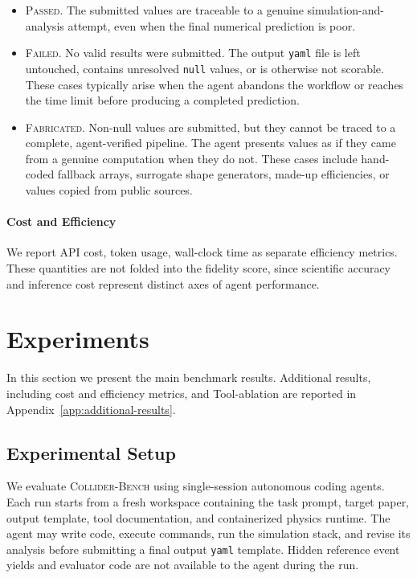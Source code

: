 \documentclass{article}
\newcommand{\ColliderBench}{\textsc{Collider-Bench}}
\begin{document}
\begin{itemize}
    \item \textsc{Passed}. The submitted values are traceable to a genuine simulation-and-analysis attempt, even when the final numerical prediction is poor.

    \item \textsc{Failed}. No valid results were submitted. The output \texttt{yaml} file is left untouched, contains unresolved \texttt{null} values, or is otherwise not scorable. These cases typically arise when the agent abandons the workflow or reaches the time limit before producing a completed prediction.

    \item \textsc{Fabricated}. Non-null values are submitted, but they cannot be traced to a complete, agent-verified pipeline. The agent presents values as if they came from a genuine computation when they do not. These cases include hand-coded fallback arrays, surrogate shape generators, made-up efficiencies, or values copied from public sources.
\end{itemize}




\paragraph{Cost and Efficiency}
We report API cost, token usage, wall-clock time as separate efficiency metrics. These quantities are not folded into the fidelity score, since scientific accuracy and inference cost represent distinct axes of agent performance.


\section{Experiments}
\label{sec:experiments}

In this section we present the main benchmark results. Additional results, including cost and efficiency metrics, and Tool-ablation  are reported in Appendix~\ref{app:additional-results}.

\subsection{Experimental Setup}
\label{sec:experimental-setup}

We evaluate \ColliderBench{} using single-session autonomous coding agents. Each run starts from a fresh workspace containing the task prompt, target paper, output template, tool documentation, and containerized physics runtime. The agent may write code, execute commands, run the simulation stack, and revise its analysis before submitting a final output \texttt{yaml} template. Hidden reference event yields and evaluator code are not available to the agent during the run.
\end{document}

